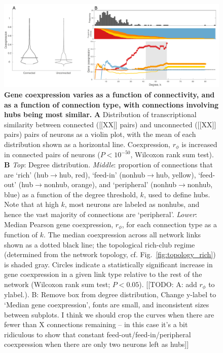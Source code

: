 \documentclass[10pt,letterpaper]{article}
\begin{document}
 \begin{figure}[h]
 \centering
    \includegraphics[width=1\textwidth]{MeanCoexpression2.pdf}
 \caption{{\bf Gene coexpression varies as a function of connectivity, and as a function of connection type, with connections involving hubs being most similar.}
\textbf{A} Distribution of transcriptional similarity between connected ([[XX]] pairs) and unconnected ([[XX]] pairs) pairs of neurons as a violin plot, with the mean of each distribution shown as a horizontal line.
Coexpression, $r_\phi$ is increased in connected pairs of neurons ($P < 10^{-50}$, Wilcoxon rank sum test).
\textbf{B}
\emph{Top}: Degree distribution.
\emph{Middle}: proportion of connections that are `rich' (hub$\rightarrow$hub, red), `feed-in' (nonhub$\rightarrow$hub, yellow), `feed-out' (hub$\rightarrow$nonhub, orange), and `peripheral' (nonhub$\rightarrow$nonhub, blue) as a function of the degree threshold, $k$, used to define hubs.
Note that at high $k$, most neurons are labeled as nonhubs, and hence the vast majority of connections are `peripheral'.
\emph{Lower}: Median Pearson gene coexpression, $r_\phi$, for each connection type as a function of $k$.
The median coexpression across all network links shown as a dotted black line; the topological rich-club regime (determined from the network topology, cf. Fig.~\ref{fig:topology_rich}) is shaded gray.
Circles indicate a statistically significant increase in gene coexpression in a given link type relative to the rest of the network (Wilcoxon rank sum test; $P < 0.05$).
[[TODO: A: add $r_\phi$ to ylabel.).
B: Remove box from degree distribution, Change y-label to `Median gene coexpression', fonts are small, and inconsistent sizes between subplots.
I think we should crop the curves when there are fewer than X connections remaining -- in this case it's a bit ridiculous to show that constant feed-out/feed-in/peripheral coexpression when there are only two neurons
left as hubs]]}
 \label{fig:coExp}
\end{figure}
\end{document}
